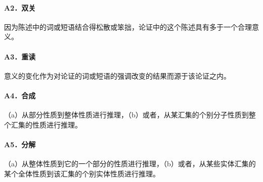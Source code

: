 \paragraph{A2．双关}
因为陈述中的词或短语结合得松散或笨拙，论证中的这个陈述具有多于一个合理意义。

\paragraph{A3．重读}
意义的变化作为对论证的词或短语的强调改变的结果而源于该论证之内。

\paragraph{A4．合成}
（a）从部分性质到整体性质进行推理，（b）或者，从某汇集的个别分子性质到整个汇集的性质进行推理。

\paragraph{A5．分解}
（a）从整体性质到它的一个部分的性质进行推理，（b）或者，从某些实体汇集的某个全体性质到该汇集的个别实体性质进行推理。

\begin{center}
\end{center}

